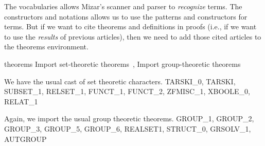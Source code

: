 \nwendcode{}\nwdocspar

The {\Tt{}vocabularies\nwendquote} allows Mizar's scanner and parser to
\emph{recognize} terms. The {\Tt{}constructors\nwendquote} and {\Tt{}notations\nwendquote} allows us
to use the patterns and constructors for terms. But if we want to cite
theorems and definitions in proofs (i.e., if we want to use the
\emph{results} of previous articles), then we need to add those cited
articles to the {\Tt{}theorems\nwendquote} environment.

\nwenddocs{}\endmoddef\nwstartdeflinemarkup{}\nwenddeflinemarkup
theorems
  \LA{}Import set-theoretic theorems~{\nwtagstyle{}}\RA{},
  \LA{}Import group-theoretic theorems~{\nwtagstyle{}}\RA{}

\nwendcode{}\nwdocspar

\M We have the usual cast of set theoretic characters.
\nwenddocs{}\endmoddef\nwstartdeflinemarkup{}\nwenddeflinemarkup
TARSKI_0, TARSKI, SUBSET_1, RELSET_1, FUNCT_1, FUNCT_2, ZFMISC_1,
XBOOLE_0, RELAT_1

\nwendcode{}\nwdocspar

\M Again, we import the usual group theoretic theorems.
\nwenddocs{}\endmoddef\nwstartdeflinemarkup{}\nwenddeflinemarkup
GROUP_1, GROUP_2, GROUP_3, GROUP_5, GROUP_6, REALSET1, STRUCT_0,
GRSOLV_1, AUTGROUP

\nwendcode{}\nwdocspar


